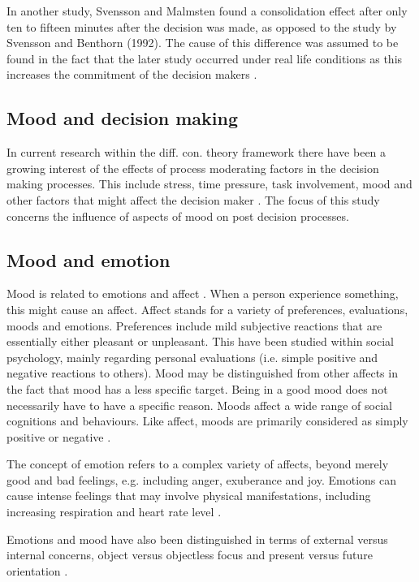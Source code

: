 In another study, Svensson and Malmsten found a consolidation effect
after only ten to fifteen minutes after the decision was made, as
opposed to the study by Svensson and Benthorn (1992).  The cause of
this difference was assumed to be found in the fact that the later
study occurred under real life conditions as this increases the
commitment of the decision makers \parencite{SvenssonMalmsten95}.


\subsection{Mood and decision making}

In current research within the diff. con. theory framework there have
been a growing interest of the effects of process moderating factors
in the decision making processes.  This include stress, time pressure,
task involvement, mood and other factors that might affect the
decision maker \parencite{Svensson95}.  The focus of this study concerns the
influence of aspects of mood on post decision processes.


\subsection{Mood and emotion}

Mood is related to emotions and affect \parencite{FiskeTaylor91}. When a
person experience something, this might cause an affect. Affect stands
for a variety of preferences, evaluations, moods and emotions.
Preferences include mild subjective reactions that are essentially
either pleasant or unpleasant.  This have been studied within social
psychology, mainly regarding personal evaluations (i.e.  simple
positive and negative reactions to others).  Mood may be distinguished
from other affects in the fact that mood has a less specific target.
Being in a good mood does not necessarily have to have a specific
reason.  Moods affect a wide range of social cognitions and
behaviours. Like affect, moods are primarily considered as simply
positive or negative \parencite{FiskeTaylor91}.

The concept of emotion refers to a complex variety of affects, beyond
merely good and bad feelings, e.g. including anger, exuberance and
joy.  Emotions can cause intense feelings that may involve physical
manifestations, including increasing respiration and heart rate level
\parencite{FiskeTaylor91}.

Emotions and mood have also been distinguished in terms of external
versus internal concerns, object versus objectless focus and present
versus future orientation \parencite{FiskeTaylor91}.

